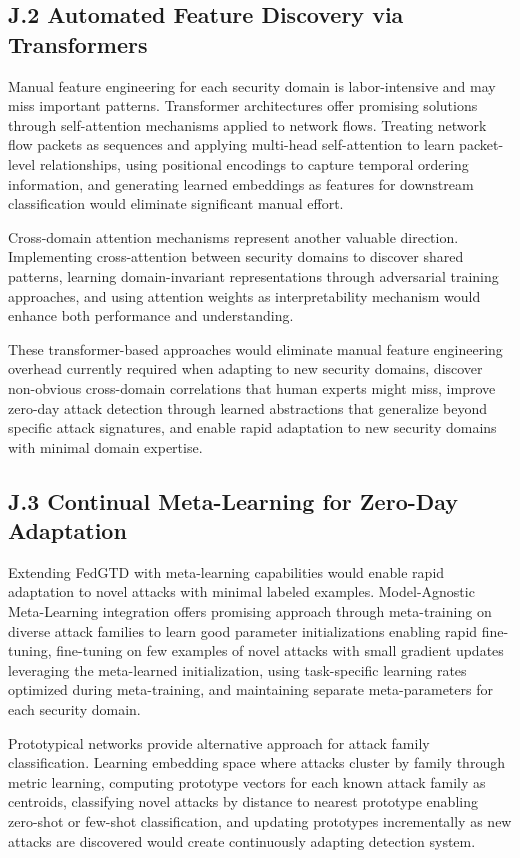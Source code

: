 \documentclass[12pt,a4paper]{article}
\theoremstyle{definition}
\begin{document}
\subsection{J.2 Automated Feature Discovery via Transformers}

Manual feature engineering for each security domain is labor-intensive and may miss important patterns. Transformer architectures offer promising solutions through self-attention mechanisms applied to network flows. Treating network flow packets as sequences and applying multi-head self-attention to learn packet-level relationships, using positional encodings to capture temporal ordering information, and generating learned embeddings as features for downstream classification would eliminate significant manual effort.

Cross-domain attention mechanisms represent another valuable direction. Implementing cross-attention between security domains to discover shared patterns, learning domain-invariant representations through adversarial training approaches, and using attention weights as interpretability mechanism would enhance both performance and understanding.

These transformer-based approaches would eliminate manual feature engineering overhead currently required when adapting to new security domains, discover non-obvious cross-domain correlations that human experts might miss, improve zero-day attack detection through learned abstractions that generalize beyond specific attack signatures, and enable rapid adaptation to new security domains with minimal domain expertise.

\subsection{J.3 Continual Meta-Learning for Zero-Day Adaptation}

Extending FedGTD with meta-learning capabilities would enable rapid adaptation to novel attacks with minimal labeled examples. Model-Agnostic Meta-Learning integration offers promising approach through meta-training on diverse attack families to learn good parameter initializations enabling rapid fine-tuning, fine-tuning on few examples of novel attacks with small gradient updates leveraging the meta-learned initialization, using task-specific learning rates optimized during meta-training, and maintaining separate meta-parameters for each security domain.

Prototypical networks provide alternative approach for attack family classification. Learning embedding space where attacks cluster by family through metric learning, computing prototype vectors for each known attack family as centroids, classifying novel attacks by distance to nearest prototype enabling zero-shot or few-shot classification, and updating prototypes incrementally as new attacks are discovered would create continuously adapting detection system.
\end{document}
